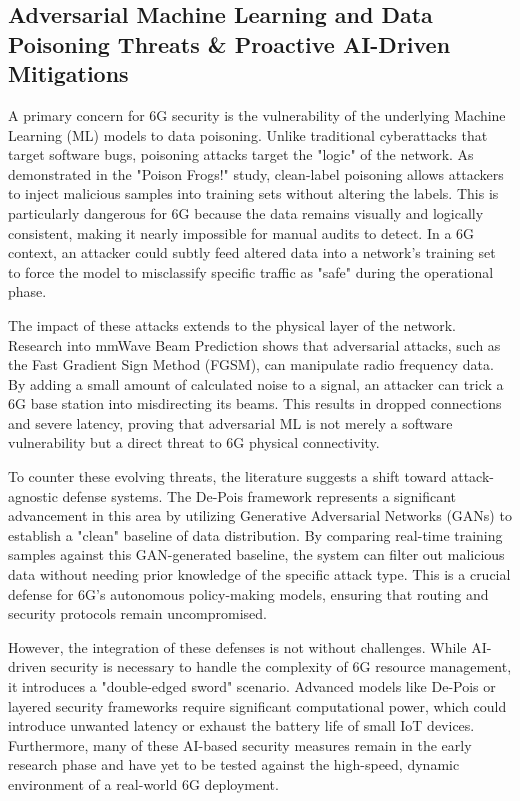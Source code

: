 \documentclass[letterpaper]{article} %
\begin{document}
\subsection{Adversarial Machine Learning and Data Poisoning Threats \& Proactive AI-Driven Mitigations}

A primary concern for 6G security is the vulnerability of the underlying Machine Learning (ML) models to data poisoning. Unlike traditional cyberattacks that target software bugs, poisoning attacks target the "logic" of the network. As demonstrated in the "Poison Frogs!" study, clean-label poisoning allows attackers to inject malicious samples into training sets without altering the labels. This is particularly dangerous for 6G because the data remains visually and logically consistent, making it nearly impossible for manual audits to detect. In a 6G context, an attacker could subtly feed altered data into a network’s training set to force the model to misclassify specific traffic as "safe" during the operational phase.

The impact of these attacks extends to the physical layer of the network. Research into mmWave Beam Prediction shows that adversarial attacks, such as the Fast Gradient Sign Method (FGSM), can manipulate radio frequency data. By adding a small amount of calculated noise to a signal, an attacker can trick a 6G base station into misdirecting its beams. This results in dropped connections and severe latency, proving that adversarial ML is not merely a software vulnerability but a direct threat to 6G physical connectivity.


To counter these evolving threats, the literature suggests a shift toward attack-agnostic defense systems. The De-Pois framework represents a significant advancement in this area by utilizing Generative Adversarial Networks (GANs) to establish a "clean" baseline of data distribution. By comparing real-time training samples against this GAN-generated baseline, the system can filter out malicious data without needing prior knowledge of the specific attack type. This is a crucial defense for 6G’s autonomous policy-making models, ensuring that routing and security protocols remain uncompromised.

However, the integration of these defenses is not without challenges. While AI-driven security is necessary to handle the complexity of 6G resource management, it introduces a "double-edged sword" scenario. Advanced models like De-Pois or layered security frameworks require significant computational power, which could introduce unwanted latency or exhaust the battery life of small IoT devices. Furthermore, many of these AI-based security measures remain in the early research phase and have yet to be tested against the high-speed, dynamic environment of a real-world 6G deployment.
\end{document}
